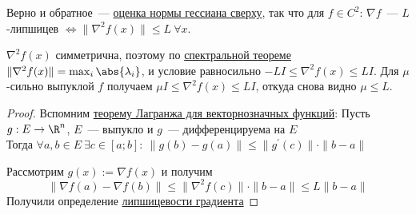 

\begin{remark}
  Верно и обратное~--- \hyperref[note:DAA0DAE4-4B48-4A2F-9459-54790B6B129F]{оценка нормы гессиана сверху}, так что для $f \in C^2$: $\nabla f$~--- $L$-липшицев $\Leftrightarrow \| \nabla^2 f(x) \| \le L\ \forall x$.
\end{remark}

\begin{remark}
  $\nabla^2 f(x)$ симметрична, поэтому по \hyperref[note:3BE0BBCE-AAB0-4CB4-8FA6-45277C0889CF]{спектральной теореме} $\| \nabla^2 f(x) \| = \max_i \abs{\lambda_i}$, и условие равносильно $-L I \le \nabla^2 f(x) \le L I$. Для $\mu$-сильно выпуклой $f$ получаем $\mu I \le \nabla^2 f(x) \le L I$, откуда снова видно $\mu \le L$.
\end{remark}

\begin{proof}
  Вспомним \hyperref[note:5821D7FE-1F9F-4578-BA2B-D60FDB0C69D3]{теорему Лагранжа для векторнозначных функций}:
  Пусть $g: E \rightarrow \R^{n}$,  $E$~--- выпукло и $g$~--- дифференцируема на $E$ \\
  Тогда $\forall a,b \in E\ \exists c \in [a;b]:\ \| g(b) - g(a) \| \le \| g^{\prime}(c) \| \cdot \| b -a \|$

  Рассмотрим $g(x) := \nabla f(x)$ и получим
  \[
  \| \nabla f(a) - \nabla f(b) \| \le \| \nabla^2 f(c) \| \cdot \| b - a \|  \le  L \| b - a \|
  \]
  Получили определение \hyperref[note:7DD1C7AB-1A49-4675-9F21-5A16C717F670]{липшицевости градиента}
\end{proof}
